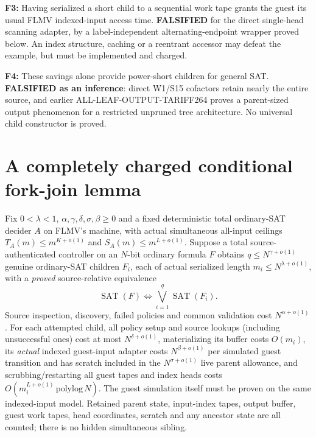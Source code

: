 \documentclass[11pt]{article}
\begin{document}
\noindent\textbf{F3:} Having serialized a short child to a sequential work tape grants the guest its usual FLMV indexed-input access time. \textbf{FALSIFIED} for the direct single-head scanning adapter, by a label-independent alternating-endpoint wrapper proved below. An index structure, caching or a reentrant accessor may defeat the example, but must be implemented and charged.

\noindent\textbf{F4:} These savings alone provide power-short children for general SAT. \textbf{FALSIFIED as an inference}: direct W1/S15 cofactors retain nearly the entire source, and earlier ALL-LEAF-OUTPUT-TARIFF264 proves a parent-sized output phenomenon for a restricted unpruned tree architecture. No universal child constructor is proved.

\section{A completely charged conditional fork-join lemma}
Fix $0<\lambda<1$, $\alpha,\gamma,\delta,\sigma,\beta\geq0$ and a fixed deterministic total ordinary-SAT decider $A$ on FLMV's machine, with actual simultaneous all-input ceilings $T_A(m)\le m^{K+o(1)}$ and $S_A(m)\le m^{L+o(1)}$. Suppose a total source-authenticated controller on an $N$-bit ordinary formula $F$ obtains $q\le N^{\gamma+o(1)}$ genuine ordinary-SAT children $F_i$, each of actual serialized length $m_i\le N^{\lambda+o(1)}$, with a \emph{proved} source-relative equivalence
\[
\operatorname{SAT}(F)\iff\bigvee_{i=1}^{q}\operatorname{SAT}(F_i).
\tag{1}
\]
Source inspection, discovery, failed policies and common validation cost $N^{\alpha+o(1)}$. For each attempted child, all policy setup and source lookups (including unsuccessful ones) cost at most $N^{\delta+o(1)}$, materializing its buffer costs $O(m_i)$, its \emph{actual} indexed guest-input adapter costs $N^{\beta+o(1)}$ per simulated guest transition and has scratch included in the $N^{\sigma+o(1)}$ live parent allowance, and scrubbing/restarting all guest tapes and index heads costs $O(m_i^{L+o(1)}\,\mathrm{polylog}\,N)$. The guest simulation itself must be proven on the same indexed-input model. Retained parent state, input-index tapes, output buffer, guest work tapes, head coordinates, scratch and any ancestor state are all counted; there is no hidden simultaneous sibling.
\end{document}
